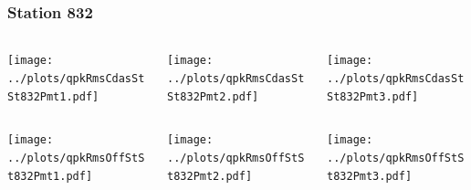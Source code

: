 \documentclass[aspectratio=169]{beamer}
\begin{document}
\begin{frame} 
  \frametitle{Station 832}
  \begin{center}
    \begin{columns}
      \begin{column}{0.33\textwidth}
        \texttt{[image: ../plots/qpkRmsCdasStSt832Pmt1.pdf]}
      \end{column}
      \begin{column}{0.33\textwidth}
        \texttt{[image: ../plots/qpkRmsCdasStSt832Pmt2.pdf]}
      \end{column}
      \begin{column}{0.33\textwidth}
        \texttt{[image: ../plots/qpkRmsCdasStSt832Pmt3.pdf]}
      \end{column}
    \end{columns}
  \end{center}

  \begin{center}
    \begin{columns}
      \begin{column}{0.33\textwidth}
        \texttt{[image: ../plots/qpkRmsOffStSt832Pmt1.pdf]}
      \end{column}
      \begin{column}{0.33\textwidth}
        \texttt{[image: ../plots/qpkRmsOffStSt832Pmt2.pdf]}
      \end{column}
      \begin{column}{0.33\textwidth}
        \texttt{[image: ../plots/qpkRmsOffStSt832Pmt3.pdf]}
      \end{column}
    \end{columns}
  \end{center}
\end{frame}
\end{document}

